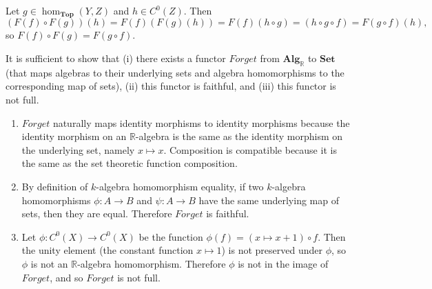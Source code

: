 \documentclass{article}
\newenvironment{problem}[2][Problem]{\begin{trivlist}
\item[\hskip \labelsep {\bfseries #1}\hskip \labelsep {\bfseries #2.}]}{\end{trivlist}}
\newenvironment{problempart}[1]{\begin{trivlist}\item[\textbf{Part #1.}]}{\end{trivlist}}
\begin{document}
\begin{problem}{7}
\begin{problempart}{(c)}
\begin{enumerate}[(i)]
{        Let $g \in \operatorname{hom}_{\textbf{Top}}(Y, Z)$ and $h \in C^0(Z)$.
        Then \[
          (F(f) \circ F(g))(h) = F(f)(F(g)(h))
          = F(f)(h\circ g)
          = (h\circ g\circ f)
          = F(g\circ f)(h),
        \] so $F(f) \circ F(g) = F(g\circ f)$.
        }
    \end{enumerate}
  \end{problempart}
  \begin{problempart}{(d)}
    It is sufficient to show that (i) there exists a functor $\textit{Forget}$ from
    $\textbf{Alg}_\mathbb{R}$ to $\textbf{Set}$ (that maps algebras to their
    underlying sets and algebra homomorphisms to the corresponding map of sets),
    (ii) this functor is faithful, and (iii) this functor is not full.
    \begin{enumerate}
      \item{
        $\mathit{Forget}$ naturally maps identity morphisms to identity morphisms
        because the identity morphism on an $\mathbb{R}$-algebra is the same as
        the identity morphism on the underlying set, namely $x \mapsto x$.
        Composition is compatible because it is the same as the set theoretic
        function composition.
      }
      \item{
        By definition of $k$-algebra homomorphism equality, if two $k$-algebra
        homomorphisms $\phi\colon A \rightarrow B$ and $\psi\colon A \rightarrow B$
        have the same underlying map of sets, then they are equal. Therefore
        $\textit{Forget}$ is faithful.
      }
      \item{
        Let $\phi\colon C^0(X) \rightarrow C^0(X)$ be the function
        $\phi(f) = (x\mapsto x + 1) \circ f$. Then the unity element (the constant
        function $x \mapsto 1$)
        is not preserved under $\phi$, so $\phi$ is not an $\mathbb{R}$-algebra
        homomorphism. Therefore $\phi$ is not in the image of $\textit{Forget}$, and so $\textit{Forget}$ is
        not full.
      }
    \end{enumerate}
  \end{problempart}
\end{problem}
\end{document}
